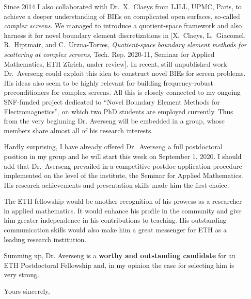 \documentclass[english]{ethbrief3}
\begin{document}
Since 2014 I also collaborated with Dr.~X.~Claeys from LJLL, UPMC, Paris, to achieve a
deeper understanding of BIEs on complicated open surfaces, so-called \emph{complex
  screens}. We managed to introduce a quotient-space framework and also harness it for
novel boundary element discretizations in $[${\sc X.~Claeys, L.~Giacomel, R.~Hiptmair, and
  C.~Urzua-Torres}, {\em Quotient-space boundary element methods for scattering at complex
  screens}, Tech. Rep. 2020-11, Seminar for Applied Mathematics, ETH Z{\"u}rich, under
review$]$. In recent, still unpublished work Dr.~Averseng could exploit this idea to
construct novel BIEs for screen problems. His ideas also seem to be highly relevant for
building frequency-robust preconditioners for complex screens. All this is closely
connected to my ongoing SNF-funded project dedicated to ``Novel Boundary Element Methods
for Electromagnetics'', on which two PhD students are employed currently. Thus from the
very beginning Dr. Averseng will be embedded in a group, whose members share almost all of
his research interests.

Hardly surprising, I have already offered Dr.~Averseng a full postdoctoral position in my
group and he will start this week on September 1, 2020. I should add that Dr.~Averseng
prevailed in a competitive postdoc application procedure implemented on the level of the
institute, the Seminar for Applied Mathematics. His research achievements and presentation
skills made him the first choice.

The ETH fellowship would be another recognition of his prowess as a researcher in applied
mathematics. It would enhance his profile in the community and give him greater
independence in his contributions to teaching. His outstanding communication skills would also
make him a great messenger for ETH as a leading research institution.

Summing up, Dr. Averseng is a \textbf{worthy and outstanding candidate} for an ETH
Postdoctoral Fellowship and, in my opinion the case for selecting him is very strong.
	
   \closing{Yours sincerely,}

\end{document}
